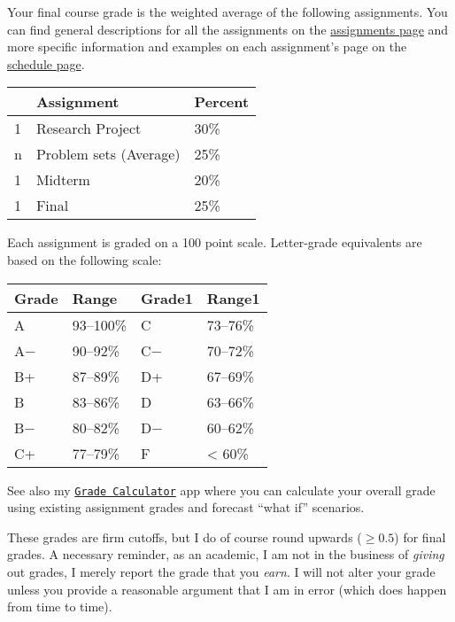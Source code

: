 \documentclass{article}
\begin{document}
Your final course grade is the weighted average of the following
assignments. You can find general descriptions for all the assignments
on the
\href{http://metricsF20.classes.ryansafner.com/assignments/}{assignments
page} and more specific information and examples on each assignment's
page on the
\href{http://metricsF20.classes.ryansafner.com/schedule/}{schedule
page}.

\begin{center}

\begin{tabular}{lll}
\toprule
 & Assignment & Percent\\
\midrule
1 & Research Project & 30\%\\
n & Problem sets (Average) & 25\%\\
1 & Midterm & 20\%\\
1 & Final & 25\%\\
\bottomrule
\end{tabular}
\end{center}

Each assignment is graded on a 100 point scale. Letter-grade equivalents
are based on the following scale:

\begin{center}

\begin{tabular}{llll}
\toprule
Grade & Range & Grade1 & Range1\\
\midrule
A & 93–100\% & C & 73–76\%\\
A− & 90–92\% & C− & 70–72\%\\
B+ & 87–89\% & D+ & 67–69\%\\
B & 83–86\% & D & 63–66\%\\
B− & 80–82\% & D− & 60–62\%\\
\addlinespace
C+ & 77–79\% & F & < 60\%\\
\bottomrule
\end{tabular}
\end{center}

See also my
\href{https://ryansafner.shinyapps.io/480_grade_calculator/}{
\texttt{Grade\ Calculator}} app where you can calculate your overall
grade using existing assignment grades and forecast ``what if''
scenarios.

These grades are firm cutoffs, but I do of course round upwards
(\(\geq 0.5\)) for final grades. A necessary reminder, as an academic, I
am not in the business of \emph{giving} out grades, I merely report the
grade that you \emph{earn}. I will not alter your grade unless you
provide a reasonable argument that I am in error (which does happen from
time to time).
\end{document}
